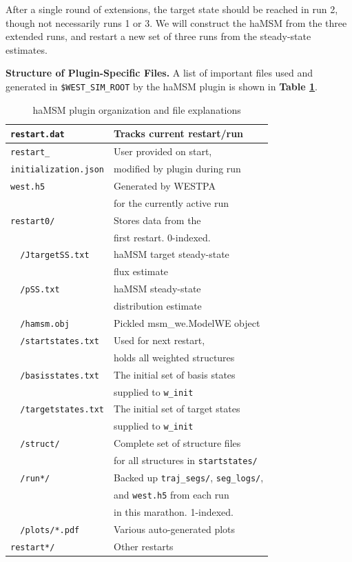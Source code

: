 After a single round of extensions, the target state should be reached in run 2, though not necessarily runs 1 or 3. 
We will construct the haMSM from the three extended runs, and restart a new set of three runs from the steady-state estimates.

\textbf{Structure of Plugin-Specific Files.} A list of important files used and generated in \verb|$WEST_SIM_ROOT| by the haMSM plugin is shown in \textbf{Table \ref{tut:hamsm-table}}.

\begin{table}[t]
\caption{haMSM plugin organization and file explanations}
\label{tut:hamsm-table}
\centering
\begin{tabular}{| l | l |}
\hline
\verb|restart.dat| & Tracks current restart/run \\
\hline
\verb|restart_| & User provided on start, \\
\verb|initialization.json| & modified by plugin during run \\
\hline
\verb|west.h5| & Generated by WESTPA \\
{} & for the currently active run \\
\hline
\verb|restart0/| & Stores data from the \\
{} & first restart. 0-indexed. \\
\hline
\verb|  /JtargetSS.txt| & haMSM target steady-state \\
{} & flux estimate \\
\hline
\verb|  /pSS.txt| & haMSM steady-state \\
{} & distribution estimate \\
\hline
\verb|  /hamsm.obj| & Pickled msm\_we.ModelWE object \\
\hline
\verb|  /startstates.txt| & Used for next restart, \\
{} & holds all weighted structures \\
\hline
\verb|  /basisstates.txt| & The initial set of basis states \\
{} & supplied to \verb|w_init| \\
\hline
\verb|  /targetstates.txt| & The initial set of target states \\
{} & supplied to \verb|w_init| \\
\hline
\verb|  /struct/| & Complete set of structure files \\
{} & for all structures in \verb|startstates/| \\
\hline
\verb|  /run*/| & Backed up \verb|traj_segs/|, \verb|seg_logs/|, \\
{} & and \verb|west.h5| from each run \\
{} & in this marathon. 1-indexed.\\
\hline
\verb|  /plots/*.pdf| & Various auto-generated plots \\
\hline
\verb|restart*/| & Other restarts \\
\hline
\end{tabular}
\end{table}

